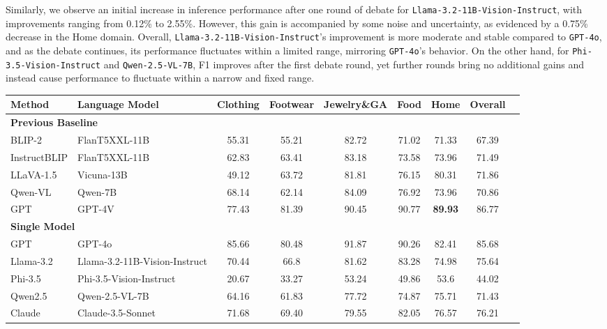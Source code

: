 \documentclass[11pt]{article}
\newcommand{\llamaname}{Llama-3.2-11B-Vision-Instruct}
\newcommand{\Qwenname}{Qwen-2.5-VL-7B}
\newcommand{\phiname}{Phi-3.5-Vision-Instruct}
\begin{document}
Similarly, we observe an initial increase in inference performance after one round of debate for \texttt{\llamaname}, with improvements ranging from 0.12\% to 2.55\%. However, this gain is accompanied by some noise and uncertainty, as evidenced by a 0.75\% decrease in the Home domain. Overall, \texttt{\llamaname}'s improvement is more moderate and stable compared to \texttt{GPT-4o}, and as the debate continues, its performance fluctuates within a limited range, mirroring \texttt{GPT-4o}'s behavior. On the other hand, for \texttt{\phiname} and \texttt{\Qwenname}, F1 improves after the first debate round, yet further rounds bring no additional gains and instead cause performance to fluctuate within a narrow and fixed range.

\begin{table}[ht]
  \centering
  \scriptsize
  \begin{tabularx}{370pt}{l l c c c c c c c}
    \hline
    \textbf{Method} & \textbf{Language Model} & 
    \textbf{Clothing} & 
    \textbf{Footwear} & 
    \textbf{Jewelry\&GA} & 
    \textbf{Food} & 
    \textbf{Home} &
    \textbf{Overall} \\
    \hline
    \multicolumn{8}{l}{\textbf{Previous Baseline}\ \citep{zou2024implicitaveopensourcedatasetmultimodal}} \\
    BLIP-2 & FlanT5XXL-11B & 55.31 & 55.21 & 82.72 & 71.02 & 71.33 & 67.39 \\
    InstructBLIP & FlanT5XXL-11B & 62.83 & 63.41 & 83.18 & 73.58 & 73.96 & 71.49 \\
    LLaVA-1.5 & Vicuna-13B & 49.12 & 63.72 & 81.81 & 76.15 & 80.31 & 71.86 \\
    Qwen-VL & Qwen-7B & 68.14 & 62.14 & 84.09 & 76.92 & 73.96 & 70.86 \\
    GPT & GPT-4V & 77.43 & 81.39 & 90.45 & 90.77 & \textbf{\textcolor{dgreen}{89.93}} & 86.77 \\
    \multicolumn{8}{l}{\textbf{Single Model}} \\
    GPT & GPT-4o & 85.66 & 80.48 & 91.87 & 90.26 & 82.41 & 85.68 \\
    Llama-3.2 & \llamaname & 70.44 & 66.8 & 81.62 & 83.28 & 74.98 & 75.64  \\
    Phi-3.5 & \phiname & 20.67 & 33.27 & 53.24 & 49.86 & 53.6 & 44.02 \\
    Qwen2.5 & \Qwenname & 64.16 & 61.83& 77.72 & 74.87 & 75.71 & 71.43 \\
    Claude & Claude-3.5-Sonnet & 71.68 & 69.40 & 79.55 & 82.05 & 76.57 & 76.21 \\ %

\end{tabularx}
\end{table}
\end{document}
